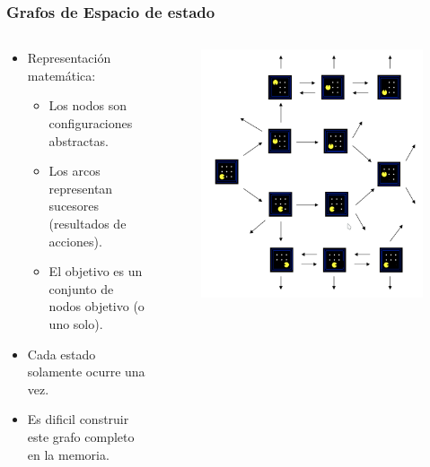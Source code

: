 \documentclass[10pt]{beamer}
\begin{document}
\begin{frame}
  \frametitle{Grafos de Espacio de estado}
  \begin{columns}
    \begin{column}{0.5\textwidth}
      \begin{itemize}
        \item Representación matemática:
          \begin{itemize}
            \item Los nodos son configuraciones abstractas.
            \item Los arcos representan sucesores (resultados de acciones).
            \item El objetivo es un conjunto de nodos objetivo (o uno solo).
          \end{itemize}
        \item Cada estado solamente ocurre una vez.
        \item Es dificil construir este grafo completo en la memoria.
      \end{itemize}
    \end{column}
    \begin{column}{0.5\textwidth}
      \begin{figure}[!h] 
        \centering
        \includegraphics[width=\textwidth]{img/grafo2}
      \end{figure}
    \end{column}
  \end{columns}
\end{frame}
\end{document}
